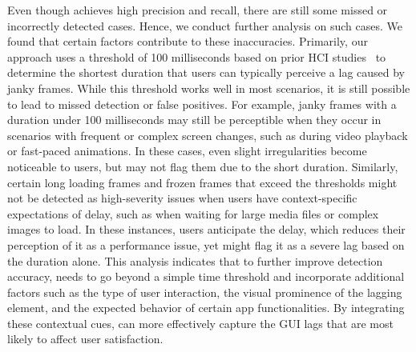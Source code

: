 Even though \tool achieves high precision and recall, there are still some missed or incorrectly detected cases. Hence, we conduct further analysis on such cases. We found that certain factors contribute to these inaccuracies. Primarily, our approach uses a threshold of 100 milliseconds based on prior HCI studies~\cite{1968_AFIPS_Response_time_in_man_computer, 1994_Usability_Engineering} to determine the shortest duration that users can typically perceive a lag caused by janky frames. While this threshold works well in most scenarios, it is still possible to lead to missed detection or false positives. 
For example, janky frames with a duration under 100 milliseconds may still be perceptible when they occur in scenarios with frequent or complex screen changes, such as during video playback or fast-paced animations. In these cases, even slight irregularities become noticeable to users, but \tool may not flag them due to the short duration. Similarly, certain long loading frames and frozen frames that exceed the thresholds might not be detected as high-severity issues when users have context-specific expectations of delay, such as when waiting for large media files or complex images to load. In these instances, users anticipate the delay, which reduces their perception of it as a performance issue, yet \tool might flag it as a severe lag based on the duration alone.
This analysis indicates that to further improve detection accuracy, \tool needs to go beyond a simple time threshold and incorporate additional factors such as the type of user interaction, the visual prominence of the lagging element, and the expected behavior of certain app functionalities. By integrating these contextual cues, \tool can more effectively capture the GUI lags that are most likely to affect user satisfaction. 







